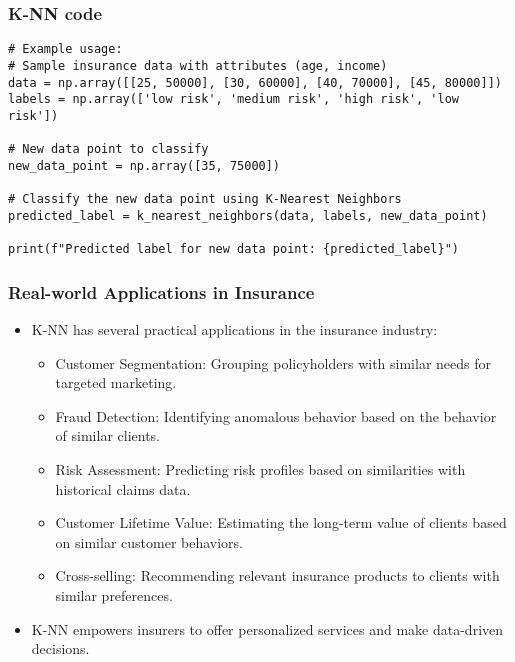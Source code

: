 \begin{frame}[fragile]\frametitle{K-NN code}

\begin{lstlisting}[basicstyle=\tiny]
# Example usage:
# Sample insurance data with attributes (age, income)
data = np.array([[25, 50000], [30, 60000], [40, 70000], [45, 80000]])
labels = np.array(['low risk', 'medium risk', 'high risk', 'low risk'])

# New data point to classify
new_data_point = np.array([35, 75000])

# Classify the new data point using K-Nearest Neighbors
predicted_label = k_nearest_neighbors(data, labels, new_data_point)

print(f"Predicted label for new data point: {predicted_label}")

\end{lstlisting}

\end{frame}

\begin{frame}[fragile]\frametitle{Real-world Applications in Insurance}
\begin{itemize}
\item K-NN has several practical applications in the insurance industry:
\begin{itemize}
\item Customer Segmentation: Grouping policyholders with similar needs for targeted marketing.
\item Fraud Detection: Identifying anomalous behavior based on the behavior of similar clients.
\item Risk Assessment: Predicting risk profiles based on similarities with historical claims data.
\item Customer Lifetime Value: Estimating the long-term value of clients based on similar customer behaviors.
\item Cross-selling: Recommending relevant insurance products to clients with similar preferences.
\end{itemize}
\item K-NN empowers insurers to offer personalized services and make data-driven decisions.
\end{itemize}
\end{frame}

